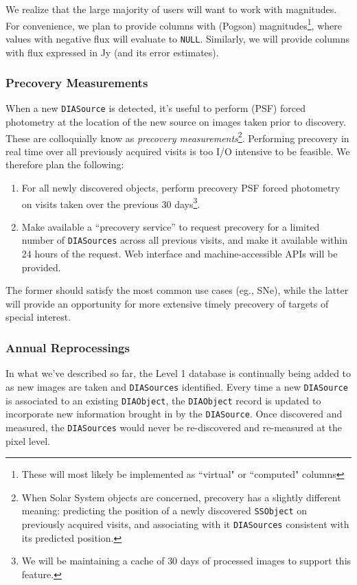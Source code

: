 \documentclass[12pt]{article}
\newcommand{\code}[1]{\texttt{#1}}
\newcommand{\DIASource}{\code{DIASource}\xspace}
\newcommand{\DIASources}{\code{DIASources}\xspace}
\newcommand{\DIAObject}{\code{DIAObject}\xspace}
\newcommand{\DB}{{Level 1 database}\xspace}
\newcommand{\SSObject}{\code{SSObject}\xspace}
\begin{document}
\vspace{1em}
We realize that the large majority of users will want to work with magnitudes. For convenience, we plan to provide columns with (Pogson) magnitudes\footnote{These will most likely be implemented as ``virtual" or ``computed" columns}, where values with negative flux will evaluate to \code{NULL}. Similarly, we will provide columns with flux expressed in Jy (and its error estimates).

\subsubsection{Precovery Measurements}

When a new \DIASource is detected, it's useful to perform (PSF) forced photometry at the location of the new source on images taken prior to discovery. These are colloquially know as {\em precovery measurements}\footnote{When Solar System objects are concerned, precovery has a slightly different meaning: predicting the position of a newly discovered \SSObject on previously acquired visits, and associating with it \DIASources consistent with its predicted position.}. Performing precovery in real time over all previously acquired visits is too I/O intensive to be feasible. We therefore plan the following:
\begin{enumerate}
\item For all newly discovered objects, perform precovery PSF forced photometry on visits taken over the previous 30 days\footnote{We will be maintaining a cache of $30$ days of processed images to support this feature.}.
\item Make available a ``precovery service'' to request precovery for a limited number of \DIASources across all previous visits, and make it available within 24 hours of the request. Web interface and machine-accessible APIs will be provided.
\end{enumerate}

The former should satisfy the most common use cases (eg., SNe), while the latter will provide an opportunity for more extensive timely precovery of targets of special interest.

\subsubsection{Annual Reprocessings}
\label{sec:l1dbreproc}

In what we've described so far, the \DB is continually being added to as new images are taken and \DIASources identified. Every time a new \DIASource is associated to an existing \DIAObject, the \DIAObject record is updated to incorporate new information brought in by the \DIASource. Once discovered and measured, the \DIASources would never be re-discovered and re-measured at the pixel level.
\end{document}
